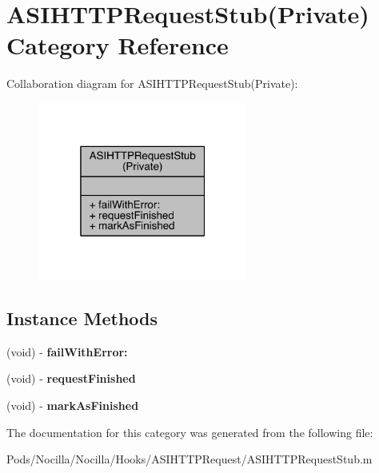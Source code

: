 \hypertarget{category_a_s_i_h_t_t_p_request_stub_07_private_08}{\section{A\-S\-I\-H\-T\-T\-P\-Request\-Stub(Private) Category Reference}
\label{category_a_s_i_h_t_t_p_request_stub_07_private_08}
}


Collaboration diagram for A\-S\-I\-H\-T\-T\-P\-Request\-Stub(Private)\-:\nopagebreak
\begin{figure}[H]
\begin{center}
\leavevmode
\includegraphics[width=196pt]{category_a_s_i_h_t_t_p_request_stub_07_private_08__coll__graph}
\end{center}
\end{figure}
\subsection*{Instance Methods}
\begin{DoxyCompactItemize}
\item 
\hypertarget{category_a_s_i_h_t_t_p_request_stub_07_private_08_af735547a88f961fa157ac78e6cfe9dc4}{(void) -\/ {\bfseries fail\-With\-Error\-:}}\label{category_a_s_i_h_t_t_p_request_stub_07_private_08_af735547a88f961fa157ac78e6cfe9dc4}

\item 
\hypertarget{category_a_s_i_h_t_t_p_request_stub_07_private_08_ad5d9982afabfaf944a752058d15df81f}{(void) -\/ {\bfseries request\-Finished}}\label{category_a_s_i_h_t_t_p_request_stub_07_private_08_ad5d9982afabfaf944a752058d15df81f}

\item 
\hypertarget{category_a_s_i_h_t_t_p_request_stub_07_private_08_a64463da2f76c47d15a1665356329420c}{(void) -\/ {\bfseries mark\-As\-Finished}}\label{category_a_s_i_h_t_t_p_request_stub_07_private_08_a64463da2f76c47d15a1665356329420c}

\end{DoxyCompactItemize}


The documentation for this category was generated from the following file\-:\begin{DoxyCompactItemize}
\item 
Pods/\-Nocilla/\-Nocilla/\-Hooks/\-A\-S\-I\-H\-T\-T\-P\-Request/A\-S\-I\-H\-T\-T\-P\-Request\-Stub.\-m\end{DoxyCompactItemize}

